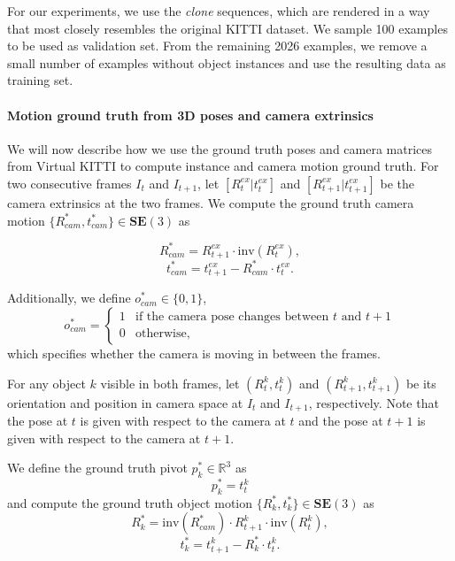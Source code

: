 For our experiments, we use the \emph{clone} sequences, which are rendered in a
way that most closely resembles the original KITTI dataset. We sample 100 examples
to be used as validation set. From the remaining 2026 examples,
we remove a small number of examples without object instances and use the resulting
data as training set.

\paragraph{Motion ground truth from 3D poses and camera extrinsics}
We will now describe how we use the ground truth poses and camera matrices from Virtual KITTI to
compute instance and camera motion ground truth.
For two consecutive frames $I_t$ and $I_{t+1}$,
let $[R_t^{ex}|t_t^{ex}]$
and $[R_{t+1}^{ex}|t_{t+1}^{ex}]$
be the camera extrinsics at the two frames.
We compute the ground truth camera motion
$\{R_{cam}^*, t_{cam}^*\} \in \mathbf{SE}(3)$ as

\begin{equation}
R_{cam}^* = R_{t+1}^{ex}  \cdot \mathrm{inv}(R_t^{ex}),
\end{equation}
\begin{equation}
t_{cam}^* = t_{t+1}^{ex}  - R_{cam}^* \cdot t_t^{ex}.
\end{equation}

Additionally, we define $o_{cam}^* \in \{ 0, 1 \}$,
\begin{equation}
o_{cam}^* =
\begin{cases}
1 &\text{if the camera pose changes between $t$ and $t+1$} \\
0 &\text{otherwise,}
\end{cases}
\end{equation}
which specifies whether the camera is moving in between the frames.

For any object $k$ visible in both frames, let
$(R_t^k, t_t^k)$ and $(R_{t+1}^k, t_{t+1}^k)$
be its orientation and position in camera space
at $I_t$ and $I_{t+1}$, respectively.
Note that the pose at $t$ is given with respect to the camera at $t$ and
the pose at $t+1$ is given with respect to the camera at $t+1$.

We define the ground truth pivot $p_k^* \in \mathbb{R}^3$ as
\begin{equation}
p_k^* = t_t^k
\end{equation}
and compute the ground truth object motion
$\{R_k^*, t_k^*\} \in \mathbf{SE}(3)$ as
\begin{equation}
R_k^* = \mathrm{inv}(R_{cam}^*) \cdot R_{t+1}^k \cdot \mathrm{inv}(R_t^k),
\end{equation}
\begin{equation}
t_k^* = t_{t+1}^{k}  - R_k^* \cdot t_t^k.
\end{equation}

